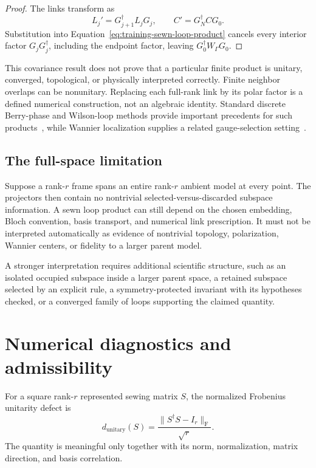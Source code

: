 \begin{proof}
The links transform as
\begin{equation}
  L_j'=G_{j+1}^{\dagger}L_jG_j,
  \qquad
  C'=G_N^{\dagger}CG_0.
\end{equation}
Substitution into Equation~\eqref{eq:training-sewn-loop-product} cancels every
interior factor \(G_jG_j^{\dagger}\), including the endpoint factor, leaving
\(G_0^{\dagger}W_{\Gamma}G_0\).
\end{proof}

This covariance result does not prove that a particular finite product is
unitary, converged, topological, or physically interpreted correctly. Finite
neighbor overlaps can be nonunitary. Replacing each full-rank link by its polar
factor is a defined numerical construction, not an algebraic identity. Standard
discrete Berry-phase and Wilson-loop methods provide important precedents for
such products~\cite{fukui2005,soluyanov2011}, while Wannier localization supplies
a related gauge-selection setting~\cite{marzari1997,marzari2012}.

\subsection{The full-space limitation}

Suppose a rank-\(r\) frame spans an entire rank-\(r\) ambient model at every
point. The projectors then contain no nontrivial selected-versus-discarded
subspace information. A sewn loop product can still depend on the chosen
embedding, Bloch convention, basis transport, and numerical link prescription.
It must not be interpreted automatically as evidence of nontrivial topology, polarization,
Wannier centers, or fidelity to a larger parent model.

A stronger interpretation requires additional scientific structure, such as an
isolated occupied subspace inside a larger parent space, a retained subspace
selected by an explicit rule, a symmetry-protected invariant with its
hypotheses checked, or a converged family of loops supporting the claimed
quantity.

\section{Numerical diagnostics and admissibility}

\begin{definition}
\label{def:training-sewing-unitarity-defect}
For a square rank-\(r\) represented sewing matrix \(S\), the normalized
Frobenius unitarity defect is
\begin{equation}
  d_{\mathrm{unitary}}(S)
  =\frac{\lVert S^{\dagger}S-I_r\rVert_{\mathrm F}}{\sqrt r}.
  \label{eq:training-sewing-unitarity-defect}
\end{equation}
The quantity is meaningful only together with its norm, normalization, matrix
direction, and basis correlation.
\end{definition}

